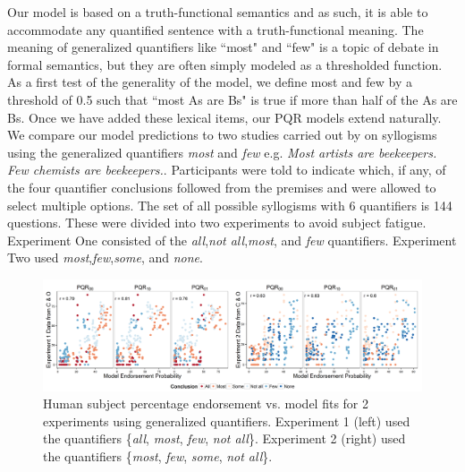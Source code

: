 \documentclass[10pt,letterpaper]{article}
\begin{document}
Our model is based on a truth-functional semantics and as such, it is able to accommodate any quantified sentence with a truth-functional meaning. The meaning of generalized quantifiers like ``most" and ``few" is a topic of debate in formal semantics, but they are often simply modeled as a thresholded function. As a first test of the generality of the model, we define most and few by a threshold of 0.5 such that ``most As are Bs" is true if more than half of the As are Bs. Once we have added these lexical items, our PQR models extend naturally. 
%
We compare our model predictions to two studies carried out by  on syllogisms using the generalized quantifiers \emph{most} and \emph{few} e.g. \emph{Most artists are beekeepers. Few chemists are beekeepers.}. Participants were told to indicate which, if any, of the four quantifier conclusions followed from the premises and were allowed to select multiple options.
%
The set of all possible syllogisms with 6 quantifiers is 144 questions.  These were divided into two experiments to avoid subject fatigue. Experiment One consisted of the \emph{all},\emph{not all},\emph{most}, and \emph{few} quantifiers. Experiment Two used \emph{most},\emph{few},\emph{some}, and \emph{none}. 

\begin{figure}[t]
	\centering
  \includegraphics[width=\textwidth]{fig3_multiScatter_colorset_AMFO_MFIE_n6_alpha2}
      \caption{Human subject percentage endorsement vs. model fits for 2 experiments using generalized quantifiers. Experiment 1 (left) used the quantifiers \{\emph{all}, \emph{most}, \emph{few}, \emph{not all}\}. Experiment 2 (right) used the quantifiers \{\emph{most}, \emph{few}, \emph{some}, \emph{not all}\}.}
  \label{fig:mfScatter}
\end{figure}
\end{document}
